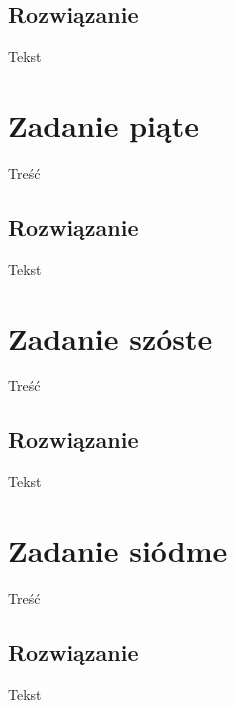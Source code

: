 \documentclass[a4paper]{article}
\begin{document}
\subsection{Rozwiązanie}
Tekst

\section{Zadanie piąte}
Treść

\subsection{Rozwiązanie}
Tekst

\section{Zadanie szóste}
Treść

\subsection{Rozwiązanie}
Tekst

\section{Zadanie siódme}
Treść

\subsection{Rozwiązanie}
Tekst
\end{document}
